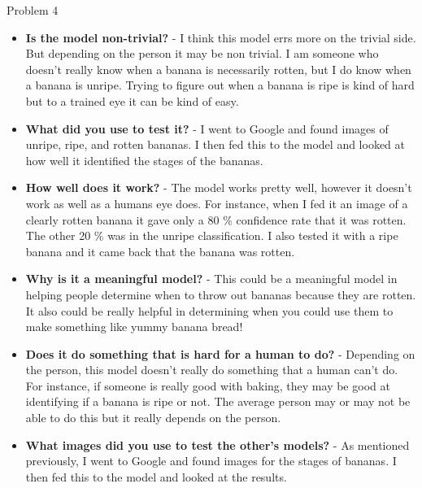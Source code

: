 \begin{problem}{Problem 4}
\begin{Highlight}[Solution]
\begin{spacing}{1.50}
            \begin{itemize}
                \item \textbf{Is the model non-trivial?} - I think this model errs more on the trivial side. But depending on the person it may be non trivial. I am someone who doesn't really know 
                when a banana is necessarily rotten, but I do know when a banana is unripe. Trying to figure out when a banana is ripe is kind of hard but to a trained eye it can be kind of easy.
                \item \textbf{What did you use to test it?} - I went to Google and found images of unripe, ripe, and rotten bananas. I then fed this to the model and looked at how well it identified
                the stages of the bananas.
                \item \textbf{How well does it work?} - The model works pretty well, however it doesn't work as well as a humans eye does. For instance, when I fed it an image of a clearly rotten banana
                it gave only a 80 \% confidence rate that it was rotten. The other 20 \% was in the unripe classification. I also tested it with a ripe banana and it came back that the banana was rotten.
                \item \textbf{Why is it a meaningful model?} - This could be a meaningful model in helping people determine when to throw out bananas because they are rotten. It also could be really helpful
                in determining when you could use them to make something like yummy banana bread!
                \item \textbf{Does it do something that is hard for a human to do?} - Depending on the person, this model doesn't really do something that a human can't do. For instance, if someone is
                really good with baking, they may be good at identifying if a banana is ripe or not. The average person may or may not be able to do this but it really depends on the person.
                \item \textbf{What images did you use to test the other's models?} - As mentioned previously, I went to Google and found images for the stages of bananas. I then fed this to the model
                and looked at the results.
            \end{itemize}
        \end{spacing}
        \vspace*{-0.5em}
    \end{Highlight}
\end{problem}